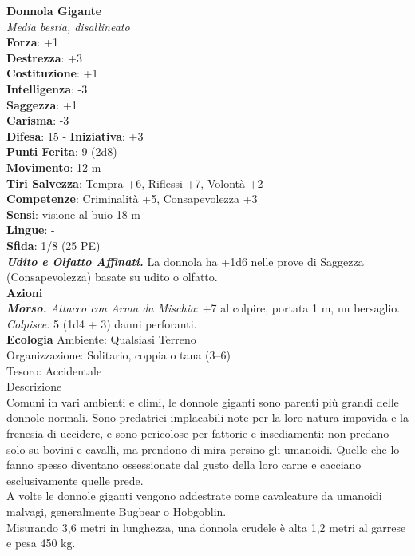 \begin{multicols}{2}
\medskip\textbf{Donnola Gigante}\\
\emph{Media bestia, disallineato}\\
\textbf{Forza}: +1\\
\textbf{Destrezza}: +3\\
\textbf{Costituzione}: +1\\
\textbf{Intelligenza}: -3\\
\textbf{Saggezza}: +1\\
\textbf{Carisma}: -3\\
\textbf{Difesa}: 15 - \textbf{Iniziativa}: +3\\
\textbf{Punti Ferita}: 9 (2d8)\\
\textbf{Movimento}: 12 m\\
\textbf{Tiri Salvezza}:  Tempra +6, Riflessi +7, Volontà +2 \\
\textbf{Competenze}: Criminalità +5, Consapevolezza +3\\
\textbf{Sensi}: visione al buio 18 m\\
\textbf{Lingue}: -\\
\textbf{Sfida}: 1/8 (25 PE)\smallskip\\
\emph{\textbf{Udito e Olfatto Affinati.}} La donnola ha +1d6 nelle prove di Saggezza (Consapevolezza) basate su udito o olfatto.\\
\smallskip\textbf{Azioni}\\
\emph{\textbf{Morso.} Attacco con Arma da Mischia}: +7 al colpire, portata 1 m, un bersaglio.\\
\emph{Colpisce:} 5 (1d4 + 3) danni perforanti.\\
\textbf{Ecologia}
Ambiente: Qualsiasi Terreno\\
Organizzazione: Solitario, coppia o tana (3–6)\\
Tesoro: Accidentale\\
Descrizione\\

Comuni in vari ambienti e climi, le donnole giganti sono parenti più grandi delle donnole normali. Sono predatrici implacabili note per la loro natura impavida e la frenesia di uccidere, e sono pericolose per fattorie e insediamenti: non predano solo su bovini e cavalli, ma prendono di mira persino gli umanoidi. Quelle che lo fanno spesso diventano ossessionate dal gusto della loro carne e cacciano esclusivamente quelle prede.\\
A volte le donnole giganti vengono addestrate come cavalcature da umanoidi malvagi, generalmente Bugbear o Hobgoblin.\\
Misurando 3,6 metri in lunghezza, una donnola crudele è alta 1,2 metri al garrese e pesa 450 kg. \\


\end{multicols}
